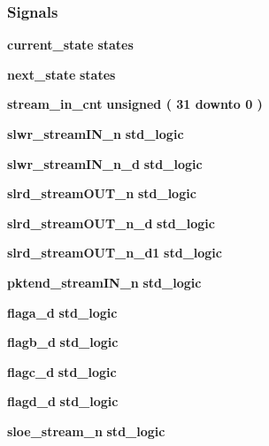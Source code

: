 \subsubsection*{Signals}
 \begin{DoxyCompactItemize}
\item 
{\bf current\+\_\+state} {\bfseries {\bfseries {\bf states}} \textcolor{vhdlchar}{ }} 
\item 
{\bf next\+\_\+state} {\bfseries {\bfseries {\bf states}} \textcolor{vhdlchar}{ }} 
\item 
{\bf stream\+\_\+in\+\_\+cnt} {\bfseries \textcolor{comment}{unsigned}\textcolor{vhdlchar}{ }\textcolor{vhdlchar}{(}\textcolor{vhdlchar}{ }\textcolor{vhdlchar}{ } \textcolor{vhdldigit}{31} \textcolor{vhdlchar}{ }\textcolor{keywordflow}{downto}\textcolor{vhdlchar}{ }\textcolor{vhdlchar}{ } \textcolor{vhdldigit}{0} \textcolor{vhdlchar}{ }\textcolor{vhdlchar}{)}\textcolor{vhdlchar}{ }} 
\item 
{\bf slwr\+\_\+stream\+I\+N\+\_\+n} {\bfseries \textcolor{comment}{std\+\_\+logic}\textcolor{vhdlchar}{ }} 
\item 
{\bf slwr\+\_\+stream\+I\+N\+\_\+n\+\_\+d} {\bfseries \textcolor{comment}{std\+\_\+logic}\textcolor{vhdlchar}{ }} 
\item 
{\bf slrd\+\_\+stream\+O\+U\+T\+\_\+n} {\bfseries \textcolor{comment}{std\+\_\+logic}\textcolor{vhdlchar}{ }} 
\item 
{\bf slrd\+\_\+stream\+O\+U\+T\+\_\+n\+\_\+d} {\bfseries \textcolor{comment}{std\+\_\+logic}\textcolor{vhdlchar}{ }} 
\item 
{\bf slrd\+\_\+stream\+O\+U\+T\+\_\+n\+\_\+d1} {\bfseries \textcolor{comment}{std\+\_\+logic}\textcolor{vhdlchar}{ }} 
\item 
{\bf pktend\+\_\+stream\+I\+N\+\_\+n} {\bfseries \textcolor{comment}{std\+\_\+logic}\textcolor{vhdlchar}{ }} 
\item 
{\bf flaga\+\_\+d} {\bfseries \textcolor{comment}{std\+\_\+logic}\textcolor{vhdlchar}{ }} 
\item 
{\bf flagb\+\_\+d} {\bfseries \textcolor{comment}{std\+\_\+logic}\textcolor{vhdlchar}{ }} 
\item 
{\bf flagc\+\_\+d} {\bfseries \textcolor{comment}{std\+\_\+logic}\textcolor{vhdlchar}{ }} 
\item 
{\bf flagd\+\_\+d} {\bfseries \textcolor{comment}{std\+\_\+logic}\textcolor{vhdlchar}{ }} 
\item 
{\bf sloe\+\_\+stream\+\_\+n} {\bfseries \textcolor{comment}{std\+\_\+logic}\textcolor{vhdlchar}{ }} 

\end{DoxyCompactItemize}
